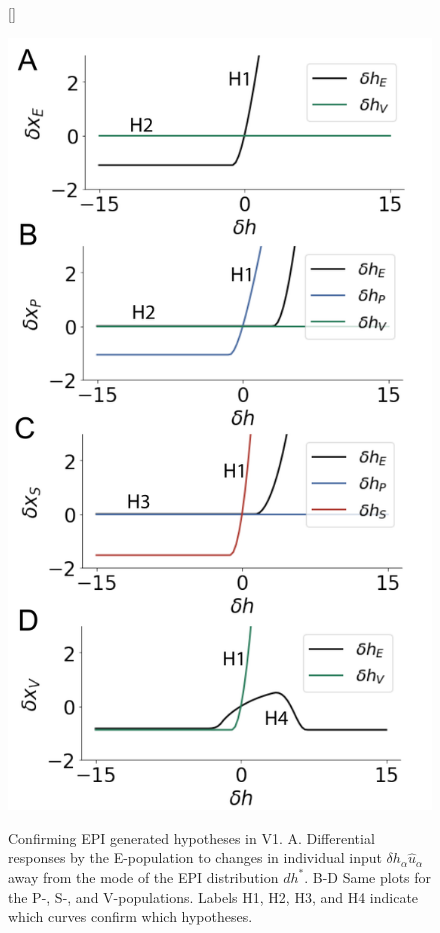 \documentclass[11pt]{article}
\begin{document}
\begin{figure}
[\FBwidth]
{\caption{Confirming EPI generated hypotheses in V1. A. Differential responses by the E-population to changes in individual input $\delta h_\alpha \hat{u}_\alpha$ away from the mode of the EPI distribution $dh^*$. B-D Same plots for the P-, S-, and V-populations.  Labels H1, H2, H3, and H4 indicate which curves confirm which hypotheses.}\label{fig:V1_HT}}
{\includegraphics[scale=0.6]{figures/fig3/fig3.pdf}}
\end{figure}
\end{document}
